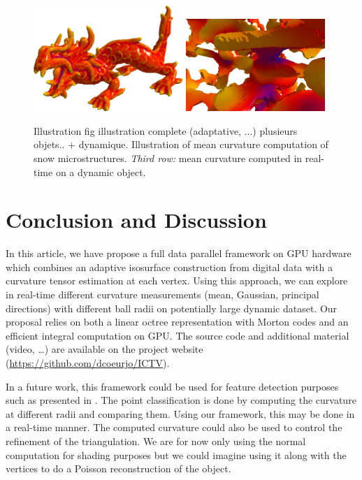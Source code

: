 \documentclass{llncs}
\begin{document}
\begin{figure}
  \begin{center}
    {\includegraphics[height=4.0cm]{figs/xyzrgb_dragon-510_R8_mean}}
    {\includegraphics[height=3.5cm]{figs/snow_I08iso_233_r20_l0_m3}}
  \end{center}
  \caption{Illustration fig illustration complete (adaptative, ...) plusieurs
    objets.. + dynamique.
    Illustration of mean curvature computation of snow microstructures.
    \emph{Third row:} mean curvature computed in real-time on a dynamic object.}
  \label{fig:adaptive}
\end{figure}



\section{Conclusion and Discussion}
\label{sec:discussion}

In this article, we have propose a full data parallel framework on GPU
hardware which combines an adaptive isosurface construction from
digital data with a curvature tensor estimation at each vertex. Using
this approach, we can explore in real-time different curvature
measurements (mean, Gaussian, principal directions) with different
ball radii on potentially large dynamic dataset. Our proposal relies
on both a linear octree representation with Morton codes and an
efficient integral computation on GPU. The source code and additional
material (video, \ldots) are available on the project website
(\url{https://github.com/dcoeurjo/ICTV}).

In a future work, this framework could be used for feature detection purposes
such as presented in \cite{SMI2015}. The point classification is done by computing
the curvature at different radii and comparing them. Using our framework,
this may be done in a real-time manner.
The computed curvature could also be used to control the refinement of the
triangulation. We are for now only using the normal computation for shading
purposes but we could imagine using it along with the vertices to do a
Poisson reconstruction of the object.
\end{document}
